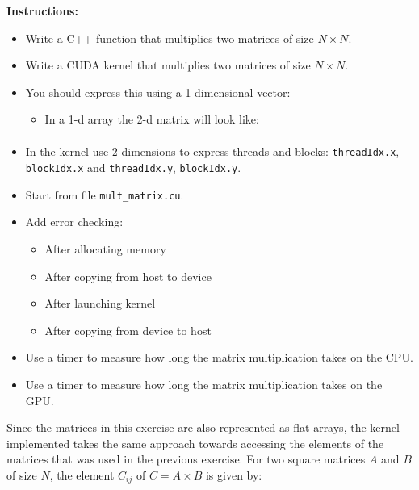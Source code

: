 \documentclass{article}
\newcounter{exercise}
\newenvironment{exr}[1]{%
    \refstepcounter{exercise}
    \begin{tcolorbox}[colback=blue!5!white, colframe=blue!75!black, title=Exercise \theexercise]
    \textbf{Instructions:} #1
    \end{tcolorbox}
    \vspace{1em}
}{}
\begin{document}



\begin{exr}{
    \begin{itemize}
      \item Write a C++ function that multiplies two matrices of size $N\times N$.
      \item Write a CUDA kernel that multiplies two matrices of size $N\times N$.
      \item You should express this using a 1-dimensional vector:
        \begin{itemize}
          \item In a 1-d array the 2-d matrix will look like: 
          \begin{align*}
              [A_{11},\, A_{12},\, A_{13},\, \dots,\, A_{1N}, A_{21},\, A_{22},\, \dots,\, A_{2N}, \dots, A_{N1},\, A_{N2},\, \dots,\, A_{NN}]
          \end{align*}
        \end{itemize}
      \item In the kernel use 2-dimensions to express threads and blocks: \texttt{threadIdx.x}, \texttt{blockIdx.x} and \texttt{threadIdx.y}, \texttt{blockIdx.y}.
      \item Start from file \texttt{mult\_matrix.cu}.
      \item Add error checking:
        \begin{itemize}
          \item After allocating memory
          \item After copying from host to device
          \item After launching kernel
          \item After copying from device to host
        \end{itemize}
      \item Use a timer to measure how long the matrix multiplication takes on the CPU.
      \item Use a timer to measure how long the matrix multiplication takes on the GPU.
    \end{itemize}
}\end{exr}

Since the matrices in this exercise are also represented as flat arrays, the kernel implemented takes the same approach towards accessing the elements of the matrices that was used in the previous exercise. For two square matrices $A$ and $B$ of size $N$, the element $C_{ij}$ of $C = A\times B$ is given by:
\end{document}
